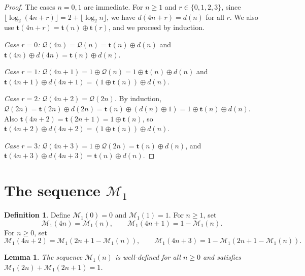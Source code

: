 \documentclass[12pt,reqno]{article}
\theoremstyle{plain}
\newtheorem{lemma}[theorem]{Lemma}
\theoremstyle{definition}
\newtheorem{definition}[theorem]{Definition}
\theoremstyle{remark}
\begin{document}
\begin{proof}
 The cases $n=0,1$ are immediate. For $n \geq 1$ and $r \in \{0,1,2,3\}$, since $\lfloor\log_2(4 n + r)\rfloor = 2 + \lfloor\log_2 n\rfloor$, 
 we have $d(4n+r) = d(n)$ for all $r$. We also use $\mathbf{t}(4n+r) = \mathbf{t}(n) \oplus \mathbf{t}(r)$, and we proceed
 by induction. 

\emph{Case $r=0$:} $\mathcal{Q}(4n)=\mathcal{Q}(n)=\mathbf{t}(n) 
 \oplus d(n)$ and $\mathbf{t}(4n)\oplus d(4n)=\mathbf{t}(n)\oplus d(n)$.

\emph{Case $r=1$:} $\mathcal{Q}(4n+1)=1\oplus\mathcal{Q}(n) = 
 1\oplus\mathbf{t}(n)\oplus d(n)$ and $\mathbf{t}(4n+1)
 \oplus d(4n+1)=(1\oplus\mathbf{t}(n))\oplus d(n)$.

\emph{Case $r=2$:} $\mathcal{Q}(4n+2)=\mathcal{Q}(2n)$. By induction, $\mathcal{Q}(2 
 n)=\mathbf{t}(2n)\oplus d(2n)=\mathbf{t}(n)\oplus(d(n) 
 \oplus 1)=1\oplus\mathbf{t}(n)\oplus d(n)$. Also $\mathbf{t}(4 n + 
 2)=\mathbf{t}(2n+1)=1\oplus\mathbf{t}(n)$, so $\mathbf{t}(4 n + 
 2)\oplus d(4n+2)=(1\oplus\mathbf{t}(n))\oplus d(n)$.

\emph{Case $r=3$:} $\mathcal{Q}(4n+3)=1\oplus\mathcal{Q}(2n)=\mathbf{t}(n)\oplus d(n)$, 
 and $\mathbf{t}(4n+3)\oplus d(4n+3)=\mathbf{t}(n)\oplus d(n)$.
\end{proof}

\section{\texorpdfstring{The sequence $\mathcal{M}_{1}$}{The sequence M1}}\label{sec:meta1} 

\begin{definition}
 Define $\mathcal{M}_{1}(0)=0$ and $\mathcal{M}_{1}(1)=1$. For $n\ge 1$, set
\begin{equation}\label{eq:M1-01} 
 \mathcal{M}_{1}(4n) = \mathcal{M}_{1}(n),\qquad \mathcal{M}_{1}(4n+1) = 1-\mathcal{M}_{1}(n).
\end{equation}
 For $n\ge 0$, set
\begin{equation}\label{eq:M1-23} 
 \mathcal{M}_{1}(4n+2) = \mathcal{M}_{1}(2n+1-\mathcal{M}_{1}(n)),\qquad
 \mathcal{M}_{1}(4n+3) = 1-\mathcal{M}_{1}(2n+1-\mathcal{M}_{1}(n)).
\end{equation}
\end{definition}

\begin{lemma}\label{lem:M1-wd} 
The sequence $\mathcal{M}_{1}(n)$ is well-defined for all $n\ge 0$ and satisfies $\mathcal{M}_{1}(2n)+\mathcal{M}_{1}(2n+1)=1$.
\end{lemma}
\end{document}
